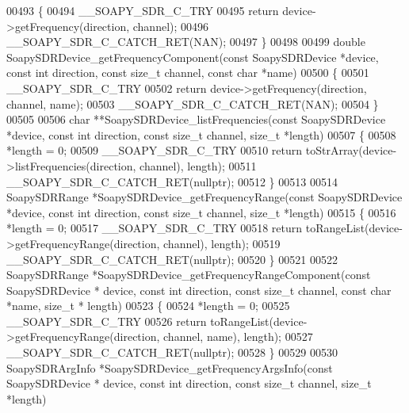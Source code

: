\begin{DoxyCode}
00493 \{
00494     __SOAPY_SDR_C_TRY
00495     \textcolor{keywordflow}{return} device->getFrequency(direction, channel);
00496     __SOAPY_SDR_C_CATCH_RET(NAN);
00497 \}
00498 
00499 \textcolor{keywordtype}{double} SoapySDRDevice_getFrequencyComponent(\textcolor{keyword}{const} SoapySDRDevice *device, \textcolor{keyword}{const} \textcolor{keywordtype}{int} direction, \textcolor{keyword}{const} \textcolor{keywordtype}{size\_t}
       channel, \textcolor{keyword}{const} \textcolor{keywordtype}{char} *name)
00500 \{
00501     __SOAPY_SDR_C_TRY
00502     \textcolor{keywordflow}{return} device->getFrequency(direction, channel, name);
00503     __SOAPY_SDR_C_CATCH_RET(NAN);
00504 \}
00505 
00506 \textcolor{keywordtype}{char} **SoapySDRDevice_listFrequencies(\textcolor{keyword}{const} SoapySDRDevice *device, \textcolor{keyword}{const} \textcolor{keywordtype}{int} direction, \textcolor{keyword}{const} \textcolor{keywordtype}{size\_t} 
      channel, \textcolor{keywordtype}{size\_t} *length)
00507 \{
00508     *length = 0;
00509     __SOAPY_SDR_C_TRY
00510     \textcolor{keywordflow}{return} toStrArray(device->listFrequencies(direction, channel), length);
00511     __SOAPY_SDR_C_CATCH_RET(\textcolor{keyword}{nullptr});
00512 \}
00513 
00514 SoapySDRRange *SoapySDRDevice_getFrequencyRange(\textcolor{keyword}{const} SoapySDRDevice *device, \textcolor{keyword}{const} \textcolor{keywordtype}{int} direction, \textcolor{keyword}{const} \textcolor{keywordtype}{
      size\_t} channel, \textcolor{keywordtype}{size\_t} *length)
00515 \{
00516     *length = 0;
00517     __SOAPY_SDR_C_TRY
00518     \textcolor{keywordflow}{return} toRangeList(device->getFrequencyRange(direction, channel), length);
00519     __SOAPY_SDR_C_CATCH_RET(\textcolor{keyword}{nullptr});
00520 \}
00521 
00522 SoapySDRRange *SoapySDRDevice_getFrequencyRangeComponent(\textcolor{keyword}{const} SoapySDRDevice *
      device, \textcolor{keyword}{const} \textcolor{keywordtype}{int} direction, \textcolor{keyword}{const} \textcolor{keywordtype}{size\_t} channel, \textcolor{keyword}{const} \textcolor{keywordtype}{char} *name, \textcolor{keywordtype}{size\_t} *
      length)
00523 \{
00524     *length = 0;
00525     __SOAPY_SDR_C_TRY
00526     \textcolor{keywordflow}{return} toRangeList(device->getFrequencyRange(direction, channel, name), 
      length);
00527     __SOAPY_SDR_C_CATCH_RET(\textcolor{keyword}{nullptr});
00528 \}
00529 
00530 SoapySDRArgInfo *SoapySDRDevice_getFrequencyArgsInfo(\textcolor{keyword}{const} SoapySDRDevice *
      device, \textcolor{keyword}{const} \textcolor{keywordtype}{int} direction, \textcolor{keyword}{const} \textcolor{keywordtype}{size\_t} channel, \textcolor{keywordtype}{size\_t} *length)

\end{DoxyCode}
